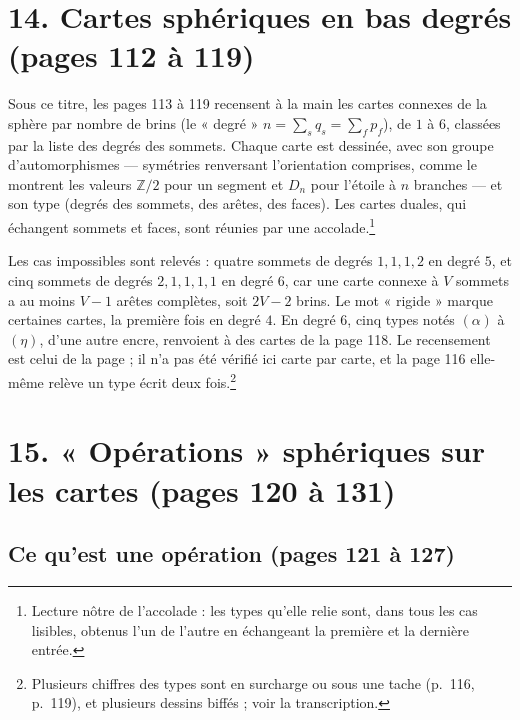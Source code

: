\documentclass[11pt,a4paper]{article}
\begin{document}
\section*{14. Cartes sphériques en bas degrés (pages 112 à 119)}

Sous ce titre, les pages 113 à 119 recensent à la main les cartes connexes de
la sphère par nombre de brins (le « degré » $n = \sum_{s} q_{s} = \sum_{f}
p_{f}$), de $1$ à $6$, classées par la liste des degrés des sommets. Chaque
carte est dessinée, avec son groupe d'automorphismes --- symétries renversant
l'orientation comprises, comme le montrent les valeurs $\mathbb{Z}/2$ pour un
segment et $D_{n}$ pour l'étoile à $n$ branches --- et son type (degrés des
sommets, des arêtes, des faces). Les cartes duales, qui échangent sommets et
faces, sont réunies par une accolade.\footnote{Lecture nôtre de l'accolade : les
types qu'elle relie sont, dans tous les cas lisibles, obtenus l'un de l'autre
en échangeant la première et la dernière entrée.}

Les cas impossibles sont relevés : quatre sommets de degrés $1, 1, 1, 2$ en
degré $5$, et cinq sommets de degrés $2, 1, 1, 1, 1$ en degré $6$, car une carte
connexe à $V$ sommets a au moins $V - 1$ arêtes complètes, soit $2V - 2$ brins.
Le mot « rigide » marque certaines cartes, la première
fois en degré $4$. En degré $6$, cinq types notés $(\alpha)$ à
$(\eta)$, d'une autre encre, renvoient à des cartes de la page 118. Le recensement
est celui de la page ; il n'a pas été vérifié ici carte par carte, et la page
116 elle-même relève un type écrit deux fois.\footnote{Plusieurs chiffres des
types sont en surcharge ou sous une tache (p.~116, p.~119), et plusieurs
dessins biffés ; voir la transcription.}

\section*{15. « Opérations » sphériques sur les cartes (pages 120 à 131)}

\subsection*{Ce qu'est une opération (pages 121 à 127)}
\end{document}
